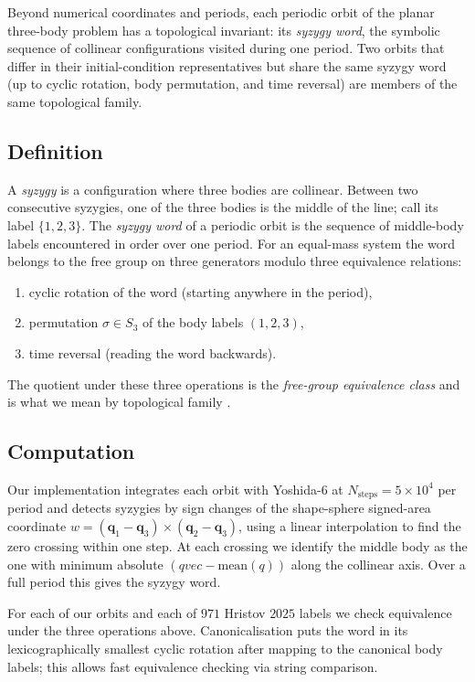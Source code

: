 \documentclass[11pt]{article}
\newcommand{\qvec}{\mathbf{q}}
\begin{document}
Beyond numerical coordinates and periods, each periodic orbit of the
planar three-body problem has a topological invariant: its \emph{syzygy
word}, the symbolic sequence of collinear configurations visited
during one period. Two orbits that differ in their initial-condition
representatives but share the same syzygy word (up to cyclic
rotation, body permutation, and time reversal) are members of the
same topological family.

\subsection{Definition}

A \emph{syzygy} is a configuration where three bodies are collinear.
Between two consecutive syzygies, one of the three bodies is the
middle of the line; call its label $\{1, 2, 3\}$. The \emph{syzygy
word} of a periodic orbit is the sequence of middle-body labels
encountered in order over one period. For an equal-mass system the
word belongs to the free group on three generators modulo three
equivalence relations:
\begin{enumerate}[leftmargin=1.5em]
  \item cyclic rotation of the word (starting anywhere in the period),
  \item permutation $\sigma \in S_3$ of the body labels $(1,2,3)$,
  \item time reversal (reading the word backwards).
\end{enumerate}
The quotient under these three operations is the \emph{free-group
equivalence class} and is what we mean by topological family
\citep{Moore1993, Montgomery2015}.

\subsection{Computation}

Our implementation integrates each orbit with Yoshida-$6$ at
$N_{\text{steps}} = 5\!\times\!10^4$ per period and detects syzygies by
sign changes of the shape-sphere signed-area coordinate
$w = (\qvec_1 - \qvec_3) \times (\qvec_2 - \qvec_3)$, using a linear
interpolation to find the zero crossing within one step. At each
crossing we identify the middle body as the one with minimum absolute
$(qvec - \text{mean}(q))$ along the collinear axis. Over a full period
this gives the syzygy word.

For each of our orbits and each of $971$ Hristov $2025$ labels we
check equivalence under the three operations above. Canonicalisation
puts the word in its lexicographically smallest cyclic rotation after
mapping to the canonical body labels; this allows fast equivalence
checking via string comparison.
\end{document}

